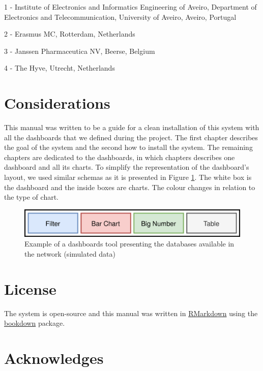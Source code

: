 \documentclass[]{book}
\begin{document}
1 - Institute of Electronics and Informatics Engineering of Aveiro,
Department of Electronics and Telecommunication, University of Aveiro,
Aveiro, Portugal

2 - Erasmus MC, Rotterdam, Netherlands

3 - Janssen Pharmaceutica NV, Beerse, Belgium

4 - The Hyve, Utrecht, Netherlands

\section*{Considerations}\label{considerations}

This manual was written to be a guide for a clean installation of this
system with all the dashboards that we defined during the project. The
first chapter describes the goal of the system and the second how to
install the system. The remaining chapters are dedicated to the
dashboards, in which chapters describes one dashboard and all its
charts. To simplify the representation of the dashboard's layout, we
used similar schemas as it is presented in Figure
\ref{fig:dashboardsLayout}. The white box is the dashboard and the
inside boxes are charts. The colour changes in relation to the type of
chart.

\begin{figure}
\includegraphics[width=1\linewidth]{images/dashboardsLayout} \caption{Example of a dashboards tool presenting the databases available in the network (simulated data)}\label{fig:dashboardsLayout}
\end{figure}

\section*{License}\label{license}

The system is open-source and this manual was written in
\href{https://rmarkdown.rstudio.com}{RMarkdown} using the
\href{https://bookdown.org}{bookdown} package.

\section*{Acknowledges}\label{acknowledges}
\end{document}
